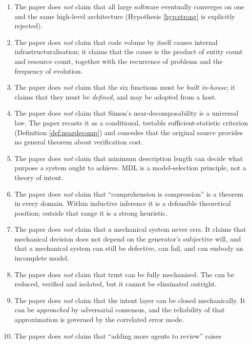 \begin{enumerate}[label=(N\arabic*)]
\item The paper does \emph{not} claim that all large software eventually converges on one
      and the same high-level architecture (Hypothesis \ref{hyp:strong} is explicitly
      rejected).
\item The paper does \emph{not} claim that code volume by itself causes internal
      infrastructuralisation; it claims that the cause is the product of entity count and
      resource count, together with the recurrence of problems and the frequency of
      evolution.
\item The paper does \emph{not} claim that the six functions must be \emph{built
      in-house}; it claims that they must be \emph{defined}, and may be adopted from a host.
\item The paper does \emph{not} claim that Simon's near-decomposability is a universal law.
      The paper recasts it as a conditional, testable sufficient-statistic criterion
      (Definition \ref{def:neardecomp}) and concedes that the original source provides no
      general theorem about verification cost.
\item The paper does \emph{not} claim that minimum description length can decide what
      purpose a system ought to achieve. MDL is a model-selection principle, not a theory
      of intent.
\item The paper does \emph{not} claim that ``comprehension is compression'' is a theorem in
      every domain. Within inductive inference it is a defensible theoretical position;
      outside that range it is a strong heuristic.
\item The paper does \emph{not} claim that a mechanical system never errs. It claims that
      mechanical decision does not depend on the generator's subjective will, and that a
      mechanical system can still be defective, can fail, and can embody an incomplete
      model.
\item The paper does \emph{not} claim that trust can be fully mechanised. The \TCB{} can be
      reduced, verified and isolated, but it cannot be eliminated outright.
\item The paper does \emph{not} claim that the intent layer can be closed mechanically. It
      can be \emph{approached} by adversarial consensus, and the reliability of that
      approximation is governed by the correlated error mode.
\item The paper does \emph{not} claim that ``adding more agents to review'' raises

\end{enumerate}
